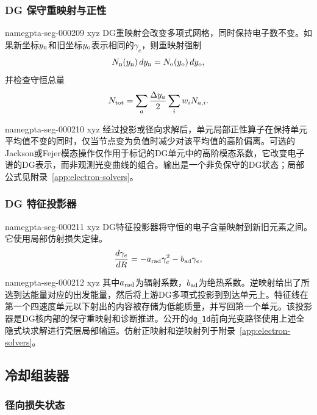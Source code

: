 \documentclass[twocolumn]{aastex702}
\makeatletter
\providecommand{\gptareaderanchor}[1]{\pdfdest name{#1} xyz}%
\providecommand{\gptareaderanchor}[1]{\special{pdf:dest (#1) [ @thispage /XYZ @xpos @ypos null ]}}%
\makeatother
\begin{document}
\subsubsection{DG 保守重映射与正性}


\gptareaderanchor{gpta-seg-000209}%
DG重映射会改变多项式网格，同时保持电子数不变。如果新坐标\(y_{\rm n}\)和旧坐标\(y_{\rm o}\)表示相同的\(\gamma_e\)，则重映射强制
\begin{equation}
N_{\rm n}(y_{\rm n})\,dy_{\rm n}
=N_{\rm o}(y_{\rm o})\,dy_{\rm o},
\end{equation}
并检查守恒总量
\begin{equation}
N_{\rm tot}=\sum_a\frac{\Delta y_a}{2}
\sum_i w_iN_{a,i}.
\end{equation}

\gptareaderanchor{gpta-seg-000210}%
经过投影或径向求解后，单元局部正性算子在保持单元平均值不变的同时，仅当节点变为负值时减少对该平均值的高阶偏离。可选的Jackson或Fejer模态操作仅作用于标记的DG单元中的高阶模态系数，它改变电子谱的DG表示，而非观测光变曲线的组合。输出是一个非负保守的DG状态；局部公式见附录~\ref{app:electron-solvers}。

\subsubsection{DG 特征投影器}


\gptareaderanchor{gpta-seg-000211}%
DG特征投影器将守恒的电子含量映射到新旧元素之间。它使用局部仿射损失定律。
\begin{equation}
\frac{d\gamma_e}{dR}=-a_{\rm rad}\gamma_e^2-b_{\rm ad}\gamma_e,
\end{equation}

\gptareaderanchor{gpta-seg-000212}%
其中\(a_{\rm rad}\)为辐射系数，\(b_{\rm ad}\)为绝热系数。逆映射给出了所选到达能量对应的出发能量，然后将上游DG多项式投影到到达单元上。特征线在第一个四速度单元以下射出的内容被存储为低能质量，并写回第一个单元。该投影器是DG核内部的保守重映射和诊断推进。公开的\texttt{dg\_1d}前向光变路径使用上述全隐式块求解进行壳层局部输运。仿射正映射和逆映射列于附录~\ref{app:electron-solvers}。

\subsection{冷却组装器}

\subsubsection{径向损失状态}
\end{document}

